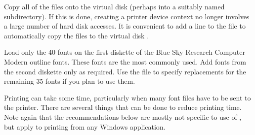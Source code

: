 \bpar Copy all of the {\PFM} files onto the virtual disk 
(perhaps into a suitably named subdirectory).  
If this is done, creating a printer device context
no longer involves a large number of hard disk accesses.
%
% 
It is convenient to add a line to the {\AUTOEXEC} file to automatically
copy the {\PFM} files to the virtual disk%
.
% 

\bpar Load only the 40 fonts on the first diskette of the 
Blue Sky Research Computer Modern outline fonts. 
These fonts are the most commonly used.  
Add fonts from the second diskette only as required.
Use the  file to specify replacements
for the remaining 35 fonts if you plan to use them.

\endbullets




Printing can take some time, particularly when many font files have to
be sent to the printer.   
There are several things that can be done to reduce printing time.
Note again that the recommendations below are mostly not specific to
use of {\DVIWindo}, but apply to printing from any Windows application.

\beginbullets

